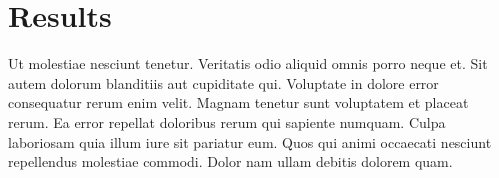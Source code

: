 \newpage
\section{Results}

Ut molestiae nesciunt tenetur. Veritatis odio aliquid omnis porro neque et. Sit autem dolorum blanditiis aut cupiditate qui.
Voluptate in dolore error consequatur rerum enim velit. Magnam tenetur sunt voluptatem et placeat rerum. Ea error repellat doloribus rerum qui sapiente numquam. Culpa laboriosam quia illum iure sit pariatur eum. Quos qui animi occaecati nesciunt repellendus molestiae commodi. Dolor nam ullam debitis dolorem quam.